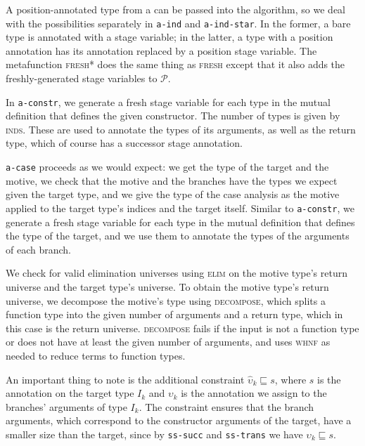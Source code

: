 \documentclass[sigplan,10pt,anonymous,review,nonacm]{acmart}
\begin{document}
A position-annotated type from a \cofixpoint can be passed into the algorithm, so we deal with the possibilities separately in \texttt{a-ind} and \texttt{a-ind-star}. In the former, a bare \coinductive type is annotated with a stage variable; in the latter, a \coinductive type with a position annotation has its annotation replaced by a position stage variable. The metafunction \textsc{fresh*} does the same thing as \textsc{fresh} except that it also adds the freshly-generated stage variables to $\mathcal{P}$.

In \texttt{a-constr}, we generate a fresh stage variable for each \coinductive type in the mutual definition that defines the given constructor. The number of types is given by \textsc{inds}. These are used to annotate the types of its \coinductive arguments, as well as the return type, which of course has a successor stage annotation.

\texttt{a-case} proceeds as we would expect: we get the type of the target and the motive, we check that the motive and the branches have the types we expect given the target type, and we give the type of the case analysis as the motive applied to the target type's indices and the target itself. Similar to \texttt{a-constr}, we generate a fresh stage variable for each \coinductive type in the mutual definition that defines the type of the target, and we use them to annotate the types of the arguments of each branch.

We check for valid elimination universes using \textsc{elim} on the motive type's return universe and the target type's universe. To obtain the motive type's return universe, we decompose the motive's type using \textsc{decompose}, which splits a function type into the given number of arguments and a return type, which in this case is the return universe. \textsc{decompose} fails if the input is not a function type or does not have at least the given number of arguments, and uses \textsc{whnf} as needed to reduce terms to function types.

An important thing to note is the additional constraint $\hat{\upsilon}_k \sqsubseteq s$, where $s$ is the annotation on the target type $I_k$ and $\upsilon_k$ is the annotation we assign to the branches' arguments of type $I_k$. The constraint ensures that the branch arguments, which correspond to the constructor arguments of the target, have a smaller size than the target, since by \texttt{ss-succ} and \texttt{ss-trans} we have $\upsilon_k \sqsubseteq s$.
\end{document}
